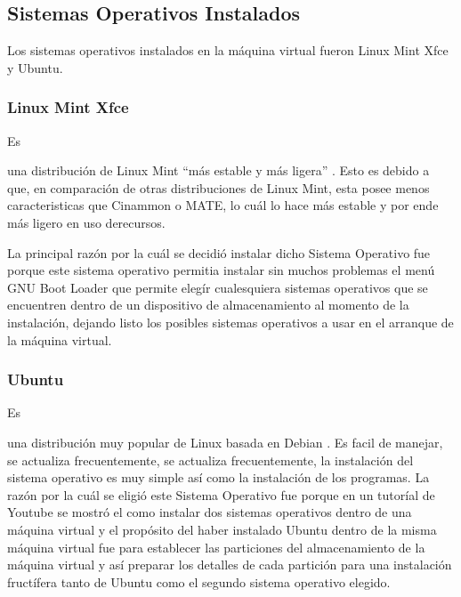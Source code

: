 \documentclass[stu, 12pt, letterpaper, donotrepeattitle, floatsintext, natbib]{apa7}
\begin{document}
    \subsection*{Sistemas Operativos Instalados}
    Los sistemas operativos instalados en la máquina virtual fueron Linux Mint Xfce y Ubuntu.\par
    \subsubsection*{Linux Mint Xfce}
    Es \begin{justifying}
      una distribución de Linux Mint ``más estable y más ligera'' \citep{unknown-author-no-dateB}. Esto es debido a que, en comparación de otras distribuciones de 
    Linux Mint, esta posee menos caracteristicas que Cinammon o MATE, lo cuál lo hace más estable y por ende más ligero en uso derecursos.\par
    La principal razón por la cuál se decidió instalar dicho Sistema Operativo fue porque este sistema operativo permitia instalar sin muchos problemas
    el menú GNU Boot Loader que permite elegír cualesquiera sistemas operativos que se encuentren dentro de un dispositivo de almacenamiento al momento de la instalación,
    dejando listo los posibles sistemas operativos a usar en el arranque de la máquina virtual.\par 
    \end{justifying}
    \vspace{\baselineskip}
    \subsubsection*{Ubuntu}
    Es \begin{justifying}
      una distribución muy popular de Linux basada en Debian \citep{unknown-author-2018}. Es facil de manejar, se actualiza frecuentemente, se actualiza frecuentemente,
    la instalación del sistema operativo es muy simple así como la instalación de los programas. La razón por la cuál se eligió
    este Sistema Operativo fue porque en un tutoríal de Youtube se mostró el como instalar dos sistemas operativos dentro de una máquina virtual y el propósito
    del haber instalado Ubuntu dentro de la misma máquina virtual fue para establecer las particiones del almacenamiento de la máquina virtual y así preparar
    los detalles de cada partición para una instalación fructífera tanto de Ubuntu como el segundo sistema operativo elegido.\par
    \end{justifying}
    \vspace{\baselineskip}
\end{document}
